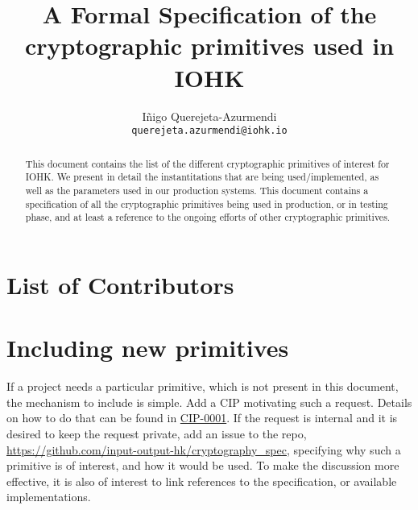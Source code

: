 \cleardoublepage%
  \tableofcontents%

  \listoffigures%
  \listoftables%
  \clearpage%
\title{A Formal Specification of the cryptographic primitives used in IOHK}

\author{I\~{n}igo Querejeta-Azurmendi  \\ {\small \texttt{querejeta.azurmendi@iohk.io}}}


\maketitle

\begin{abstract}
  This document contains the list of the different cryptographic primitives of interest for IOHK. We
  present in detail the instantitations that are being used/implemented, as well as the parameters
  used in our production systems.
  This document contains a specification of all the cryptographic primitives being used in production,
  or in testing phase, and at least a reference to the ongoing efforts of other cryptographic primitives.

\end{abstract}

\section*{List of Contributors}
\label{sec:acknowledgements}

\section*{Including new primitives}
If a project needs a particular primitive, which is not present in this document, the mechanism 
to include is simple. Add a CIP motivating such a request. Details on how to do that can be found
in \href{https://github.com/cardano-foundation/CIPs/tree/master/CIP-0001}{CIP-0001}. If the request
is internal and it is desired to keep the request private, add an issue to the repo,
\url{https://github.com/input-output-hk/cryptography_spec}, specifying why such a 
primitive is of interest, and how it would be used. To make the discussion more effective, 
it is also of interest to link references to the specification, or available implementations.
